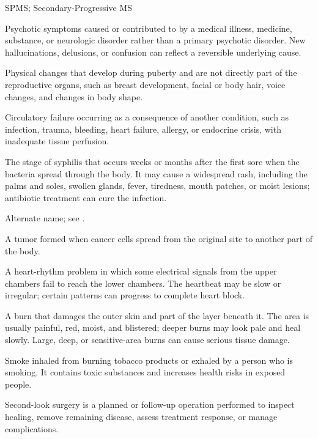 \synonyms
SPMS; Secondary-Progressive MS

 Psychotic symptoms caused or contributed to by a medical illness, medicine, substance, or neurologic disorder rather than a primary psychotic disorder. New hallucinations, delusions, or confusion can reflect a reversible underlying cause.

 Physical changes that develop during puberty and are not directly part of the reproductive organs, such as breast development, facial or body hair, voice changes, and changes in body shape.

 Circulatory failure occurring as a consequence of another condition, such as infection, trauma, bleeding, heart failure, allergy, or endocrine crisis, with inadequate tissue perfusion.

 The stage of syphilis that occurs weeks or months after the first sore when the bacteria spread through the body. It may cause a widespread rash, including the palms and soles, swollen glands, fever, tiredness, mouth patches, or moist lesions; antibiotic treatment can cure the infection.

 Alternate name; see .

 A tumor formed when cancer cells spread from the original site to another part of the body.

 A heart-rhythm problem in which some electrical signals from the upper chambers fail to reach the lower chambers. The heartbeat may be slow or irregular; certain patterns can progress to complete heart block.

 A burn that damages the outer skin and part of the layer beneath it. The area is usually painful, red, moist, and blistered; deeper burns may look pale and heal slowly. Large, deep, or sensitive-area burns can cause serious tissue damage.

 Smoke inhaled from burning tobacco products or exhaled by a person who is smoking. It contains toxic
substances and increases health risks in exposed people.

 Second-look surgery is a planned or follow-up operation performed to inspect healing, remove remaining disease, assess treatment response, or manage complications.

